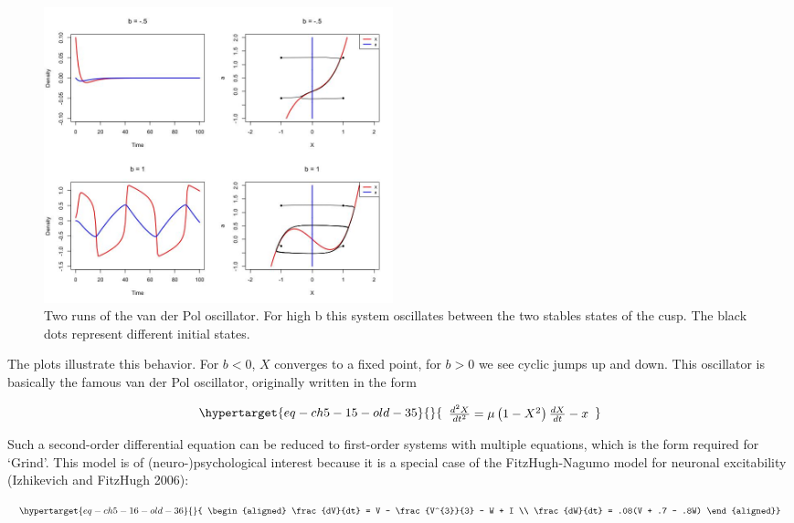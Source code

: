 \documentclass[
  letterpaper,
]{scrbook}
\begin{document}
\begin{figure}

{\centering \includegraphics[width=3.98425in,height=\textheight]{media/ch5/image14.jpg}

}

\caption{\label{fig-ch5-img14-old-62}Two runs of the van der Pol
oscillator. For high b this system oscillates between the two stables
states of the cusp. The black dots represent different initial states.}

\end{figure}

The plots illustrate this behavior. For \(b < 0\), \(X\) converges to a
fixed point, for \(b > 0\) we see cyclic jumps up and down. This
oscillator is basically the famous van der Pol oscillator, originally
written in the form

\begin{equation}\protect\hypertarget{eq-ch5-15-old-35}{}{\begin{array}{r}
\frac{d^{2}X}{dt^{2}} = \mu\left( 1 - X^{2} \right)\frac{dX}{dt} - x
\end{array}}\label{eq-ch5-15-old-35}\end{equation}

Such a second-order differential equation can be reduced to first-order
systems with multiple equations, which is the form required for `Grind'.
This model is of (neuro-)psychological interest because it is a special
case of the FitzHugh-Nagumo model for neuronal excitability (Izhikevich
and FitzHugh 2006):

\begin{equation}\protect\hypertarget{eq-ch5-16-old-36}{}{
\begin{align*}
\frac{dV}{dt} = V - \frac{V^{3}}{3} - W + I \\ 
\frac{dW}{dt} = .08(V + .7 - .8W)
\end{align*}}\label{eq-ch5-16-old-36}\end{equation}
\end{document}
